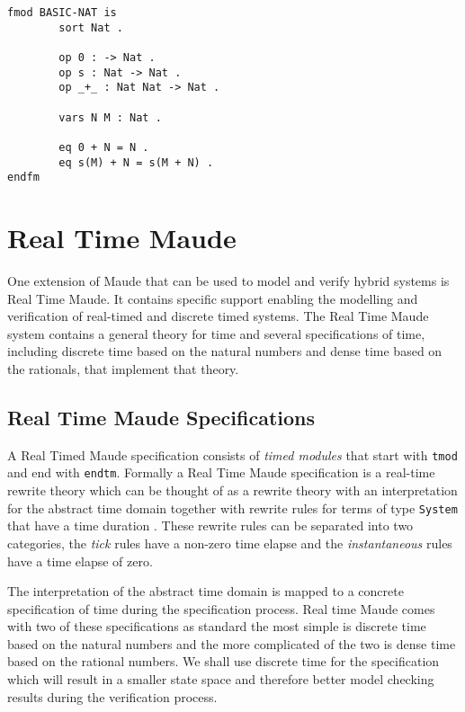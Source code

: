 \begin{lstlisting}[caption = The natural numbers in Maude, label = code:natnum]
fmod BASIC-NAT is
        sort Nat .

        op 0 : -> Nat .
        op s : Nat -> Nat .
        op _+_ : Nat Nat -> Nat .

        vars N M : Nat .

        eq 0 + N = N .
        eq s(M) + N = s(M + N) .
endfm
\end{lstlisting}



\section{Real Time Maude}
One extension of Maude that can be used to model and verify hybrid systems is Real Time Maude. It contains specific support enabling the modelling and verification of real-timed and discrete timed systems. 
The Real Time Maude system contains a general theory for time and several specifications of time, including discrete time based on the natural numbers and dense time based on the rationals, that implement that theory.

\subsection{Real Time Maude Specifications}
A Real Timed Maude specification consists of \emph{timed modules} that start with \texttt{tmod} and end with \texttt{endtm}. Formally a Real Time Maude specification is a real-time rewrite theory which can be thought of as a rewrite theory with an interpretation for the abstract time domain together with rewrite rules for terms of type \texttt{System} that have a time duration \cite{PO02}. These rewrite rules can be separated into two categories, the \emph{tick} rules have a non-zero time elapse and the \emph{instantaneous} rules have a time elapse of zero.

The interpretation of the abstract time domain is mapped to a concrete specification of time during the specification process. Real time Maude comes with two of these specifications as standard the most simple  is discrete time based on the natural numbers and the more complicated of the two is dense time based on the rational numbers. We shall use discrete time for the specification which will result in a smaller state space and therefore better model checking results during the verification process.
\medskip

